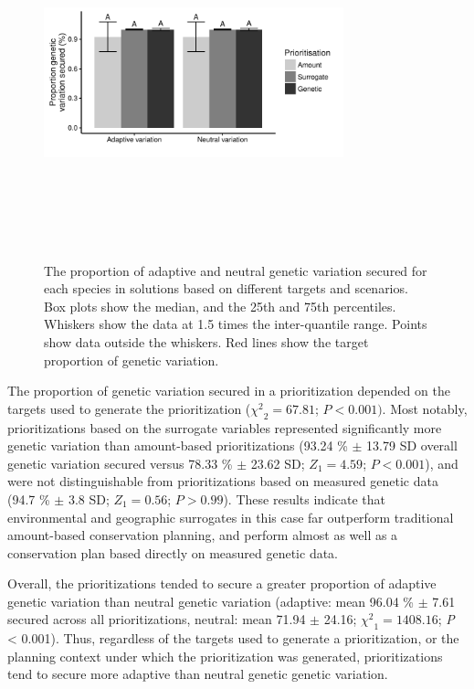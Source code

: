 \documentclass[9pt,twocolumn,twoside,lineno]{pnas-new}
\begin{document}
\begin{figure}

{\centering \includegraphics[width=3.42in,height=4in]{article_files/figure-latex/unnamed-chunk-4-1.pdf} 

}

\caption{The proportion of adaptive and neutral genetic variation secured for each species in solutions based on different targets and scenarios. Box plots show the median, and the 25th and 75th percentiles. Whiskers show the data at 1.5 times the inter-quantile range. Points show data outside the whiskers. Red lines show the target proportion of genetic variation.}\label{fig:unnamed-chunk-4}
\end{figure}

The proportion of genetic variation secured in a prioritization depended
on the targets used to generate the prioritization
(\({\chi^2}_{2} = 67.81\); \(P < 0.001)\). Most notably, prioritizations
based on the surrogate variables represented significantly more genetic
variation than amount-based prioritizations (93.24 \% \(\pm\) 13.79 SD
overall genetic variation secured versus 78.33 \% \(\pm\) 23.62 SD;
\(Z_1 = 4.59\); \(P < 0.001\)), and were not distinguishable from
prioritizations based on measured genetic data (94.7 \% \(\pm\) 3.8 SD;
\(Z_1 = 0.56\); \(P > 0.99\)). These results indicate that environmental
and geographic surrogates in this case far outperform traditional
amount-based conservation planning, and perform almost as well as a
conservation plan based directly on measured genetic data.

Overall, the prioritizations tended to secure a greater proportion of
adaptive genetic variation than neutral genetic variation (adaptive:
mean 96.04 \% \(\pm\) 7.61 secured across all prioritizations, neutral:
mean 71.94 \(\pm\) 24.16; \({\chi^2}_{1} = 1408.16\); \emph{P}
\textless{} 0.001). Thus, regardless of the targets used to generate a
prioritization, or the planning context under which the prioritization
was generated, prioritizations tend to secure more adaptive than neutral
genetic genetic variation.
\end{document}
